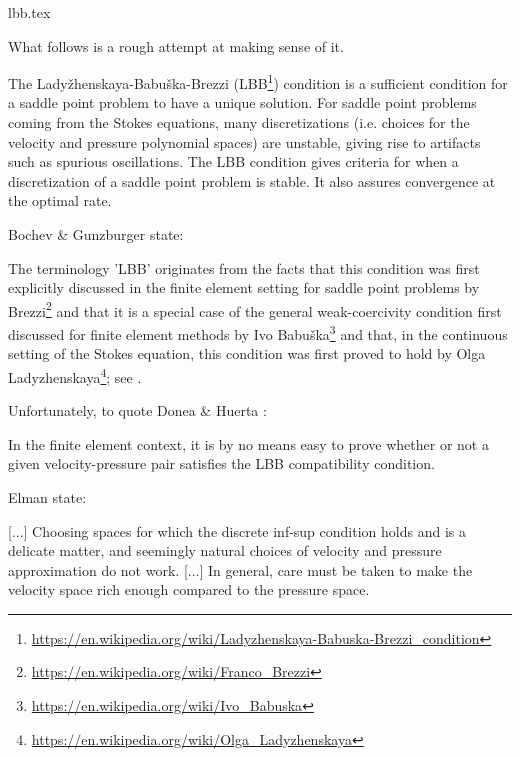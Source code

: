 \begin{flushright} {\tiny {\color{gray} lbb.tex}} \end{flushright}

What follows is a rough attempt at making sense of it.

\hspace{.4cm}

The Lady{\v z}henskaya-Babu{\v s}ka-Brezzi (LBB\footnote{
\url{https://en.wikipedia.org/wiki/Ladyzhenskaya-Babuska-Brezzi_condition}}) condition is a sufficient 
condition for a saddle point problem to have a unique solution.
For saddle point problems coming from the Stokes equations, 
many discretizations (i.e. choices for the velocity and pressure polynomial spaces)
are unstable, giving rise to artifacts such as spurious oscillations. 
The LBB condition gives criteria for when a discretization of a saddle point problem is stable. 
It also assures convergence at the optimal rate. 

Bochev \& Gunzburger \cite{bogu09} state: 
\begin{displayquote}
{\color{darkgray}
The terminology 'LBB' originates from the facts that this condition was first explicitly discussed
in the finite element setting for saddle point problems by Brezzi\footnote{
\url{https://en.wikipedia.org/wiki/Franco_Brezzi}} \cite{brez74} and that it is a special case of
the general weak-coercivity condition first discussed for finite element methods by Ivo Babu{\v s}ka\footnote{
\url{https://en.wikipedia.org/wiki/Ivo_Babuska}}
\cite{babu71} and that, in the continuous setting of the Stokes equation, this condition was first proved to
hold by Olga Ladyzhenskaya\footnote{\url{https://en.wikipedia.org/wiki/Olga_Ladyzhenskaya}}; see \cite{lady69}.
}
\end{displayquote}

Unfortunately, to quote Donea \& Huerta \cite{dohu03}: 
\begin{displayquote}
{\color{darkgray}
In the finite element context, it is by no means easy to prove whether or not a given
velocity-pressure pair satisfies the LBB compatibility condition.
}
\end{displayquote}

Elman \etal state: 
\begin{displayquote}
{\color{darkgray}
[...] Choosing spaces for which the discrete inf-sup condition holds
and is a delicate matter, and seemingly natural choices of velocity and pressure approximation
do not work. [...] In general, care must be taken to make the velocity space 
rich enough compared to the pressure space.
}
\end{displayquote}

